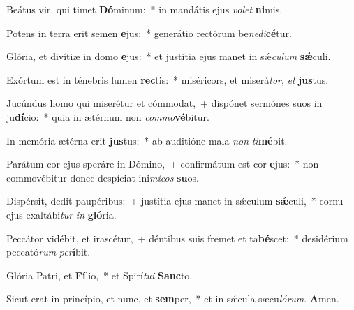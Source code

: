 \item Beátus vir, qui timet \textbf{Dó}minum:~* in mandátis ejus \textit{vo}\textit{let} \textbf{ni}mis.

\item Potens in terra erit semen \textbf{e}jus:~* generátio rectórum be\textit{ne}\textit{di}\textbf{cé}tur.

\item Glória, et divítiæ in domo \textbf{e}jus:~* et justítia ejus manet in sǽ\textit{cu}\textit{lum} \textbf{sǽ}culi.

\item Exórtum est in ténebris lumen \textbf{rec}tis:~* miséricors, et miserá\textit{tor}, \textit{et} \textbf{jus}tus.

\item Jucúndus homo qui miserétur et cómmodat,~+ dispónet sermónes suos in ju\textbf{dí}cio:~* quia in ætérnum non \textit{com}\textit{mo}\textbf{vé}bitur.

\item In memória ætérna erit \textbf{jus}tus:~* ab auditióne mala \textit{non} \textit{ti}\textbf{mé}bit.

\item Parátum cor ejus speráre in Dómino,~+ confirmátum est cor \textbf{e}jus:~* non commovébitur donec despíciat ini\textit{mí}\textit{cos} \textbf{su}os.

\item Dispérsit, dedit paupéribus:~+ justítia ejus manet in sǽculum \textbf{sǽ}culi,~* cornu ejus exaltábi\textit{tur} \textit{in} \textbf{gló}ria.

\item Peccátor vidébit, et irascétur,~+ déntibus suis fremet et ta\textbf{bé}scet:~* desidérium peccató\textit{rum} \textit{per}\textbf{í}bit.

\item Glória Patri, et \textbf{Fí}lio,~* et Spirí\textit{tu}\textit{i} \textbf{Sanc}to.

\item Sicut erat in princípio, et nunc, et \textbf{sem}per,~* et in sǽcula sæcu\textit{ló}\textit{rum}. \textbf{A}men.
